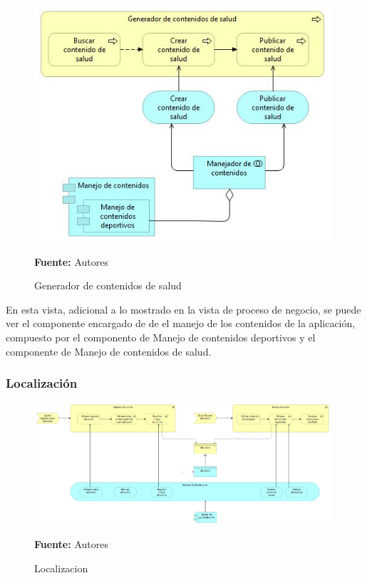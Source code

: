 \begin{figure}[!htb]
  \begin{center}
    \includegraphics[width=11cm]{./imagenes/Archimate/vistas/application_usage/generadorcontenidossalud.png}
    \caption{Generador de contenidos de salud}
    \label{fig:BP_GeneradorContenidosSalud}
    \textbf{Fuente:}  Autores
  \end{center}
\end{figure}

En esta vista, adicional a lo mostrado en la vista de proceso de negocio, se puede ver el componente encargado de de el manejo de los contenidos de la aplicación, compuesto por el componento de Manejo de contenidos deportivos y el componente de Manejo de contenidos de salud.

\subsubsection{Localización}

\begin{figure}[!htb]
  \begin{center}
    \includegraphics[width=11cm]{./imagenes/Archimate/vistas/application_usage/localizacion.png}
    \caption{Localizacion}
    \label{fig:BP_localizacion}
    \textbf{Fuente:}  Autores
  \end{center}
\end{figure}

